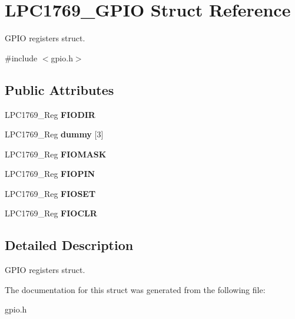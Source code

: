 \hypertarget{struct_l_p_c1769___g_p_i_o}{\section{L\+P\+C1769\+\_\+\+G\+P\+I\+O Struct Reference}
\label{struct_l_p_c1769___g_p_i_o}
}


G\+P\+I\+O registers struct.  




{\ttfamily \#include $<$gpio.\+h$>$}

\subsection*{Public Attributes}
\begin{DoxyCompactItemize}
\item 
\hypertarget{struct_l_p_c1769___g_p_i_o_a836b34b1002a1063a9101f1340fbab28}{L\+P\+C1769\+\_\+\+Reg {\bfseries F\+I\+O\+D\+I\+R}}\label{struct_l_p_c1769___g_p_i_o_a836b34b1002a1063a9101f1340fbab28}

\item 
\hypertarget{struct_l_p_c1769___g_p_i_o_a568671a7dd17718078923bb9645c3471}{L\+P\+C1769\+\_\+\+Reg {\bfseries dummy} \mbox{[}3\mbox{]}}\label{struct_l_p_c1769___g_p_i_o_a568671a7dd17718078923bb9645c3471}

\item 
\hypertarget{struct_l_p_c1769___g_p_i_o_a028c588343e6ceed2e9e43be7f4640fd}{L\+P\+C1769\+\_\+\+Reg {\bfseries F\+I\+O\+M\+A\+S\+K}}\label{struct_l_p_c1769___g_p_i_o_a028c588343e6ceed2e9e43be7f4640fd}

\item 
\hypertarget{struct_l_p_c1769___g_p_i_o_a80eba425256a7948334ba1c18c9e15c0}{L\+P\+C1769\+\_\+\+Reg {\bfseries F\+I\+O\+P\+I\+N}}\label{struct_l_p_c1769___g_p_i_o_a80eba425256a7948334ba1c18c9e15c0}

\item 
\hypertarget{struct_l_p_c1769___g_p_i_o_a6a72a8454e52b8395483c0873a295158}{L\+P\+C1769\+\_\+\+Reg {\bfseries F\+I\+O\+S\+E\+T}}\label{struct_l_p_c1769___g_p_i_o_a6a72a8454e52b8395483c0873a295158}

\item 
\hypertarget{struct_l_p_c1769___g_p_i_o_a87888920186c6c90c024babeb4c6c133}{L\+P\+C1769\+\_\+\+Reg {\bfseries F\+I\+O\+C\+L\+R}}\label{struct_l_p_c1769___g_p_i_o_a87888920186c6c90c024babeb4c6c133}

\end{DoxyCompactItemize}


\subsection{Detailed Description}
G\+P\+I\+O registers struct. 

The documentation for this struct was generated from the following file\+:\begin{DoxyCompactItemize}
\item 
gpio.\+h\end{DoxyCompactItemize}
